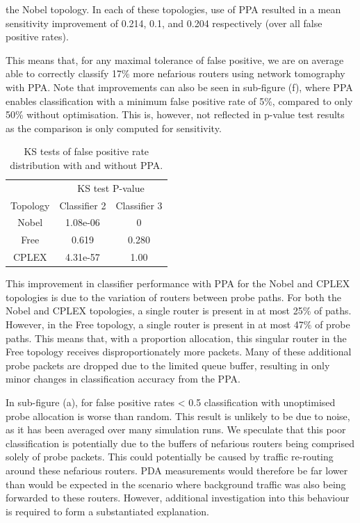 the Nobel topology. In each of these topologies, use of PPA resulted in a mean sensitivity improvement of 0.214, 0.1, and 0.204 respectively (over all false positive rates).\par
This means that, for any maximal tolerance of false positive, we are on average able to correctly classify 17\% more nefarious routers using network tomography with PPA. Note that improvements can also be seen in sub-figure (f), where PPA enables classification with a minimum false positive rate of 5\%, compared to only 50\% without optimisation. This is, however, not reflected in p-value test results as the comparison is only computed for sensitivity.\par
\begin{table}[t]
 \centering
  \begin{tabular}{@{}ccc@{}}
   \toprule
   &\multicolumn{2}{c}{KS test P-value}\\
   \cmidrule(lr){2-3}
    Topology & Classifier 2 & Classifier 3 \\
    \midrule
    Nobel & 1.08e-06 & 0\\
    Free  & 0.619 & 0.280\\
    CPLEX & 4.31e-57 & 1.00\\
   \bottomrule
  \end{tabular}
  \caption{KS tests of false positive rate distribution with and without PPA.}
  \label{tbl:Roptkstest}
\end{table}
This improvement in classifier performance with PPA for the Nobel and CPLEX topologies is due to the variation of routers between probe paths. For both the Nobel and CPLEX topologies, a single router is present in at most 25\% of paths. However, in the Free topology, a single router is present in at most 47\% of probe paths. This means that, with a proportion allocation, this singular router in the Free topology receives disproportionately more packets. Many of these additional probe packets are dropped due to the limited queue buffer, resulting in only minor changes in classification accuracy from the PPA.\par
In sub-figure (a), for false positive rates < 0.5 classification with unoptimised probe allocation is worse than random. This result is unlikely to be due to noise, as it has been averaged over many simulation runs. We speculate that this poor classification is potentially due to the buffers of nefarious routers being comprised solely of probe packets. This could potentially be caused by traffic re-routing around these nefarious routers. PDA measurements would therefore be far lower than would be expected in the scenario where background traffic was also being forwarded to these routers. However, additional investigation into this behaviour is required to form a substantiated explanation.


